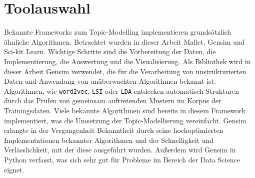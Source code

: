 \documentclass[german,version-2020-11]{uzl-thesis}
\begin{document}
\section{Toolauswahl}
Bekannte Frameworks zum Topic-Modelling implementieren grundsätzlich ähnliche Algorithmen. Betrachtet wurden in dieser Arbeit Mallet, Gensim und Sci-kit Learn.  Wichtige Schritte sind die Vorbereitung der Daten, die Implementierung, die Auswertung und die Visualisierung. Als Bibliothek wird in dieser Arbeit Gensim verwendet, die für die Verarbeitung von unstrukturierten Daten und Anwendung von unüberwachten Algorithmen bekannt ist. Algorithmen, wie \lstinline{word2vec}, \lstinline{LSI} oder \lstinline{LDA} entdecken automatisch Strukturen durch das Prüfen von gemeinsam auftretenden Mustern im Korpus der Trainingsdaten. Viele bekannte Algorithmen sind bereits in diesem Framework implementiert, was die Umsetzung der Topic-Modellierung vereinfacht. Gensim erlangte in der Vergangenheit Bekanntheit durch seine hochoptimierten Implementationen bekannter Algorithmen und der Schnelligkeit und Verlässlichkeit, mit der diese ausgeführt wurden. Außerdem wird Gensim in Python verfasst, was sich sehr gut für Probleme im Bereich der Data Science eignet. 
\end{document}
